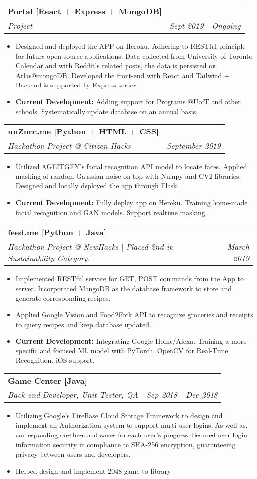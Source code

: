 \documentclass[letterpaper,4pt]{article}
\makeatletter
\newcommand{\resumeItem}[2]{
  \item\small{
    \textbf{#1}{#2 \vspace{-2pt}}
  }
}
\newcommand{\resumeSubheading}[4]{
  \vspace{-1pt}\item
    \begin{tabular*}{0.97\textwidth}{l@{\extracolsep{\fill}}r}
      \textbf{#1} & #2 \\
      \textit{\small#3} & \textit{\small #4} \\
    \end{tabular*}\vspace{-5pt}
}
\newcommand{\resumeItemListStart}{\begin{itemize}}
\newcommand{\resumeItemListEnd}{\end{itemize}\vspace{0pt}}
\makeatother
\begin{document}
    \resumeSubheading
    {\href{https://github.com/MaXeraph/Portal}{\underline{Portal}} [React + Express + MongoDB]}{}
    {Project}{Sept 2019 - Ongoing}
    \resumeItemListStart
      \resumeItem{}
          {Designed and deployed the APP on Heroku. Adhering to RESTful principle for future open-source applications. Data collected from University of Toronto \href{https://fas.calendar.utoronto.ca/}{\underline{Calendar}} and with Reddit's related posts, the data is persisted on Atlas@mongoDB. Developed the front-end with React and Tailwind + Backend is supported by Express server.}
      \resumeItem{Current Development: }
          {Adding support for Programs @UofT and other schools. Systematically update database on an annual basis.}
    \resumeItemListEnd

    \resumeSubheading
      {\href{https://unzucc.maxpham.dev}{\underline{unZucc.me}} [Python + HTML + CSS]}{}
      {Hackathon Project @ Citizen Hacks}{September 2019}
      \resumeItemListStart
        \resumeItem{}
            {Utilized AGEITGEY's facial recognition \href{https://github.com/ageitgey/face_recognition/}{\underline{API}} model to locate faces. Applied masking of random Gaussian noise on top with Numpy and CV2 libraries. Designed and locally deployed the app through Flask.}
        \resumeItem{Current Development: }
            {Fully deploy app on Heroku. Training home-made facial recognition and GAN models. Support realtime masking.}
      \resumeItemListEnd
      
    \resumeSubheading
      {\href{https://feedme.maxpham.dev/}{\underline{feed.me}} [Python + Java]}{}
      {Hackathon Project @ NewHacks $|$ Placed 2nd in Sustainability Category.}{March 2019}
      \resumeItemListStart
        \resumeItem{}
            {Implemented RESTful service for GET, POST commands from the App to server. Incorporated MongoDB as the database framework to store and generate corresponding recipes.}
        \resumeItem{}
            {Applied Google Vision and Food2Fork API to recognize groceries and receipts to query recipes and keep database updated.}
        \resumeItem{Current Development: }
            {Integrating Google Home/Alexa. Training a more specific and focused ML model with PyTorch. OpenCV for Real-Time Recognition. iOS support.}
      \resumeItemListEnd

    \resumeSubheading
      {Game Center [Java]}{}
      {Back-end Developer, Unit Tester, QA}{Sep 2018 - Dec 2018}
    \resumeItemListStart
      \resumeItem{}
          {Utilizing Google's FireBase Cloud Storage Framework to design and implement an Authorization system to support multi-user logins. As well as, corresponding on-the-cloud saves for each user's progress. Secured user login information security in compliance to SHA-256 encryption, guaranteeing privacy between users and developers.}
      \resumeItem{}
          {Helped design and implement 2048 game to library.}
    \resumeItemListEnd
\end{document}
